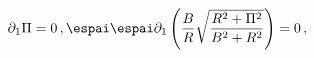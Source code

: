 \begin{equation}
\partial_1 \Pi=0 \,, \espai\espai
  \partial _1\left(\frac{B}{ R}\sqrt{\frac{ R^2+\Pi ^2}{B^2+
  R^2}}\right)=0\,,
\label{gausslaw}
\end{equation}


